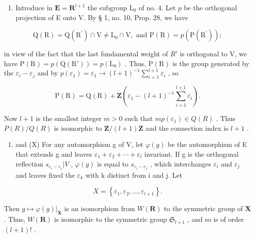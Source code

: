 \begin{enumerate}
\def\labelenumi{(\Roman{enumi})}
\setcounter{enumi}{7}
\tightlist
\item
  Introduce in \(\mathbf{E} = \mathbf{R}^{l + 1}\) the subgroup \(\mathrm{L}_0\) of no. 4. Let \(p\) be the orthogonal projection of E onto V. By § 1, no. 10, Prop. 28, we have
\end{enumerate}

\[
\mathrm{Q} (\mathrm{R}) = \mathrm{Q} \left(\mathrm{R} ^ {\prime}\right) \cap \mathrm{V} \neq \mathrm{L} _ {0} \cap \mathrm{V}, \text { and } \mathrm{P} (\mathrm{R}) = p \left(\mathrm{P} \left(\mathrm{R} ^ {\prime}\right)\right);
\]

in view of the fact that the last fundamental weight of \(R'\) is orthogonal to V, we have \(\mathrm{P}(\mathrm{R}) = p(\mathrm{Q}(\mathrm{R}')) = p(\mathrm{L}_0)\) . Thus, \(\mathrm{P}(\mathrm{R})\) is the group generated by the \(\varepsilon_i - \varepsilon_j\) and by \(p(\varepsilon_1) = \varepsilon_1 \to (l + 1)^{-1} \sum_{i=1}^{l+1} \varepsilon_i\) , so

\[
\mathrm{P} (\mathrm{R}) = \mathrm{Q} (\mathrm{R}) + \mathbf {Z} \left(\varepsilon_ {1} - (l + 1) ^ {- 1} \sum_ {i = 1} ^ {l + 1} \varepsilon_ {i}\right).
\]

Now \(l + 1\) is the smallest integer \(m > 0\) such that \(mp(\varepsilon_1) \in Q(R)\) . Thus \(P(R)/Q(R)\) is isomorphic to \(\mathbf{Z}/(l + 1)\mathbf{Z}\) and the connection index is \(l + 1\) .

\begin{enumerate}
\def\labelenumi{(\Roman{enumi})}
\setcounter{enumi}{8}
\tightlist
\item
  and (X) For any automorphism g of V, let \(\varphi(g)\) be the automorphism of E that extends g and leaves \(\varepsilon_{1} + \varepsilon_{2} + \cdots + \varepsilon_{l}\) invariant. If g is the orthogonal reflection \(s_{\varepsilon_{i} - \varepsilon_{j}}|V\) , \(\varphi(g)\) is equal to \(s_{\varepsilon_{i} - \varepsilon_{j}}\) , which interchanges \(\varepsilon_{i}\) and \(\varepsilon_{j}\) and leaves fixed the \(\varepsilon_{k}\) with k distinct from i and j. Let
\end{enumerate}

\[
X = \left\{\varepsilon_ {1}, \varepsilon_ {2}, \dots , \varepsilon_ {l + 1} \right\}.
\]

Then \(g \mapsto \varphi(g)|_{\mathbf{X}}\) is an isomorphism from \(W(\mathbf{R})\) to the symmetric group of \(\mathbf{X}\) . Thus, \(W(\mathbf{R})\) is isomorphic to the symmetric group \(\mathfrak{S}_{l+1}\) , and so is of order \((l+1)!\) .


